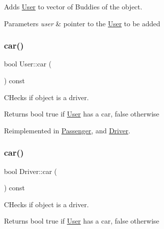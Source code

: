 Adds \hyperlink{class_user}{User} to vector of Buddies of the object. 


\begin{DoxyParams}{Parameters}
{\em user} & pointer to the \hyperlink{class_user}{User} to be added \\
\hline
\end{DoxyParams}
\mbox{\label{group___user_ga86635e817828c81ee5e18b2e802e3218}} 
\subsubsection{\texorpdfstring{car()}{car()}\hspace{0.1cm}{\footnotesize\ttfamily [1/3]}}
{\footnotesize\ttfamily bool User\+::car (\begin{DoxyParamCaption}{ }\end{DoxyParamCaption}) const\hspace{0.3cm}{\ttfamily [virtual]}}



C\+Hecks if object is a driver. 

\begin{DoxyReturn}{Returns}
bool true if \hyperlink{class_user}{User} has a car, false otherwise 
\end{DoxyReturn}


Reimplemented in \hyperlink{group___user_gaeb69b29d53079577e41f070da1f442dd}{Passenger}, and \hyperlink{group___user_gaf8b79bce2879830b12e6f3ec954192a2}{Driver}.

\mbox{\label{group___user_gaf8b79bce2879830b12e6f3ec954192a2}} 
\subsubsection{\texorpdfstring{car()}{car()}\hspace{0.1cm}{\footnotesize\ttfamily [2/3]}}
{\footnotesize\ttfamily bool Driver\+::car (\begin{DoxyParamCaption}{ }\end{DoxyParamCaption}) const\hspace{0.3cm}{\ttfamily [virtual]}}



C\+Hecks if object is a driver. 

\begin{DoxyReturn}{Returns}
bool true if \hyperlink{class_user}{User} has a car, false otherwise 
\end{DoxyReturn}


